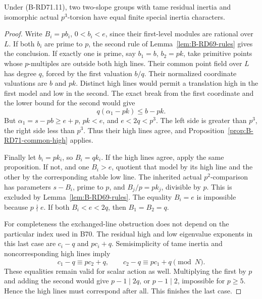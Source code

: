 \begin{proposition}
\label{prop:B-RD71-tame}
Under (B-RD71.11), two two-slope groups with tame residual
inertia and isomorphic actual \(p^3\)-torsion have equal
finite special inertia characters.
\end{proposition}
\begin{proof}
Write \(B_i=pb_i\), \(0<b_i<e\), since their first-level
modules are rational over \(L\).
If both \(b_i\) are prime to \(p\), the second rule of
Lemma~\ref{lem:B-RD69-rules} gives the conclusion.
If exactly one is prime, say \(b_1=b\), \(b_2=pk\), take
primitive points whose \(p\)-multiples are outside both
high lines. Their common point field over \(L\) has degree
\(q\), forced by the first valuation \(b/q\).
Their normalized coordinate valuations are \(b\) and \(pk\).
Distinct high lines would permit a translation high in
the first model and low in the second. The exact break
from the first coordinate and the lower bound for the second
would give
\[
 q(\alpha_1-pk)\le b-pk .
 \tag{B-RD71.15}
\]
But \(\alpha_1=s-pb\ge e+p\), \(pk<e\), and
\(e<2q<p^3\). The left side is greater than \(p^3\),
the right side less than \(p^3\). Thus their high lines
agree, and Proposition~\ref{prop:B-RD71-common-high} applies.

Finally let \(b_i=pk_i\), so \(B_i=qk_i\).
If the high lines agree, apply the same proposition.
If not, and one \(B_i>e\), quotient that model by its high
line and the other by the corresponding stable low line.
The inherited actual \(p^2\)-comparison has parameters
\(s-B_i\), prime to \(p\), and \(B_j/p=pk_j\),
divisible by \(p\). This is excluded by
Lemma~\ref{lem:B-RD69-rules}.
The equality \(B_i=e\) is impossible because \(p\nmid e\).
If both \(B_i<e<2q\), then \(B_1=B_2=q\).

For completeness the exchanged-line obstruction does not
depend on the particular index used in B70.
The residual high and low eigenvalue exponents in this
last case are \(c_i-q\) and \(pc_i+q\).
Semisimplicity of tame inertia and noncorresponding high
lines imply
\[
 c_1-q\equiv pc_2+q,\qquad
 c_2-q\equiv pc_1+q\pmod N.
 \tag{B-RD71.16}
\]
These equalities remain valid for scalar action as well.
Multiplying the first by \(p\) and adding the second would
give \(p-1\mid2q\), or \(p-1\mid2\), impossible for \(p\ge5\).
Hence the high lines must correspond after all.
This finishes the last case.
\end{proof}

